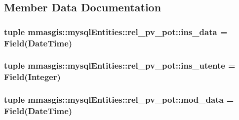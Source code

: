 \subsection{Member Data Documentation}
\hypertarget{classmmasgis_1_1mysqlEntities_1_1rel__pv__pot_af025c4016d6ac2732fa3bc13929b8286}{
\subsubsection[{ins\_\-data}]{\setlength{\rightskip}{0pt plus 5cm}tuple {\bf mmasgis::mysqlEntities::rel\_\-pv\_\-pot::ins\_\-data} = Field(DateTime)}}
\label{classmmasgis_1_1mysqlEntities_1_1rel__pv__pot_af025c4016d6ac2732fa3bc13929b8286}
\hypertarget{classmmasgis_1_1mysqlEntities_1_1rel__pv__pot_a769af9015dac1f9d84a4d7d57aae49b0}{
\subsubsection[{ins\_\-utente}]{\setlength{\rightskip}{0pt plus 5cm}tuple {\bf mmasgis::mysqlEntities::rel\_\-pv\_\-pot::ins\_\-utente} = Field(Integer)}}
\label{classmmasgis_1_1mysqlEntities_1_1rel__pv__pot_a769af9015dac1f9d84a4d7d57aae49b0}
\hypertarget{classmmasgis_1_1mysqlEntities_1_1rel__pv__pot_a792cb5d5b004bce95168870dcb9fa46d}{
\subsubsection[{mod\_\-data}]{\setlength{\rightskip}{0pt plus 5cm}tuple {\bf mmasgis::mysqlEntities::rel\_\-pv\_\-pot::mod\_\-data} = Field(DateTime)}}
\label{classmmasgis_1_1mysqlEntities_1_1rel__pv__pot_a792cb5d5b004bce95168870dcb9fa46d}
